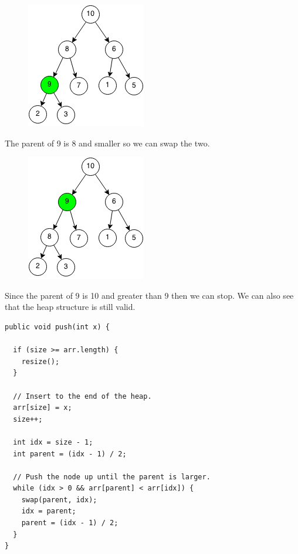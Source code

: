 \documentclass[11pt,oneside]{book}
\makeatletter
\def\maxwidth#1{\ifdim\Gin@nat@width>#1 #1\else\Gin@nat@width\fi}
\makeatother
\begin{document}
\vspace{5px}\begin{figure}[H]\centering
        \includegraphics[width=0.66\maxwidth{\textwidth}]{maxheappush2.png}
        \end{figure}

The parent of 9 is 8 and smaller so we can swap the two.

\vspace{5px}\begin{figure}[H]\centering
        \includegraphics[width=0.66\maxwidth{\textwidth}]{maxheappush3.png}
        \end{figure}

Since the parent of 9 is 10 and greater than 9 then we can stop. We can also see that the heap structure is still valid.

\begin{lstlisting}
public void push(int x) {

  if (size >= arr.length) {
    resize();
  }

  // Insert to the end of the heap.
  arr[size] = x;
  size++;

  int idx = size - 1;
  int parent = (idx - 1) / 2;

  // Push the node up until the parent is larger.
  while (idx > 0 && arr[parent] < arr[idx]) {
    swap(parent, idx);
    idx = parent;
    parent = (idx - 1) / 2;
  }
}
\end{lstlisting}
\end{document}
